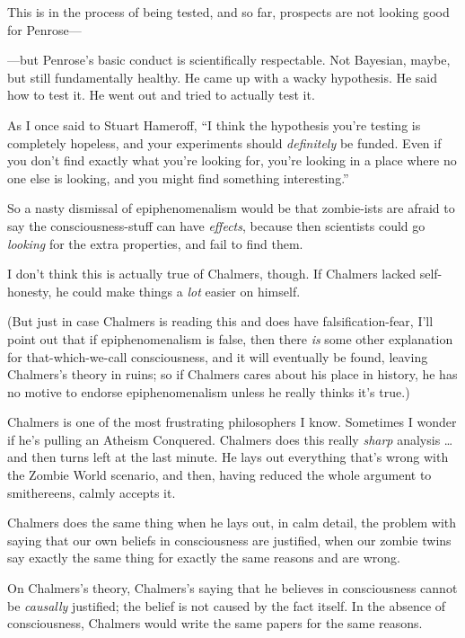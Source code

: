 {
 This is in the process of being tested, and so far, prospects are
not looking good for Penrose---}

{
 {}---but Penrose's basic conduct is scientifically
respectable. Not Bayesian, maybe, but still fundamentally healthy. He
came up with a wacky hypothesis. He said how to test it. He went out
and tried to actually test it.}

{
 As I once said to Stuart Hameroff, ``I think the
hypothesis you're testing is completely hopeless, and
your experiments should \textit{definitely} be funded. Even if you
don't find exactly what you're looking
for, you're looking in a place where no one else is
looking, and you might find something interesting.''}

{
 So a nasty dismissal of epiphenomenalism would be that zombie-ists
are afraid to say the consciousness-stuff can have \textit{effects},
because then scientists could go \textit{looking} for the extra
properties, and fail to find them.}

{
 I don't think this is actually true of Chalmers,
though. If Chalmers lacked self-honesty, he could make things a
\textit{lot} easier on himself.}

{
 (But just in case Chalmers is reading this and does have
falsification-fear, I'll point out that if
epiphenomenalism is false, then there \textit{is} some other
explanation for that-which-we-call consciousness, and it will
eventually be found, leaving Chalmers's theory in
ruins; so if Chalmers cares about his place in history, he has no
motive to endorse epiphenomenalism unless he really thinks
it's true.)}

{
 Chalmers is one of the most frustrating philosophers I know.
Sometimes I wonder if he's pulling an Atheism
Conquered. Chalmers does this really \textit{sharp} analysis \ldots and
then turns left at the last minute. He lays out everything
that's wrong with the Zombie World scenario, and then,
having reduced the whole argument to smithereens, calmly accepts it.}

{
 Chalmers does the same thing when he lays out, in calm detail, the
problem with saying that our own beliefs in consciousness are
justified, when our zombie twins say exactly the same thing for exactly
the same reasons and are wrong.}

{
 On Chalmers's theory, Chalmers's
saying that he believes in consciousness cannot be \textit{causally}
justified; the belief is not caused by the fact itself. In the absence
of consciousness, Chalmers would write the same papers for the same
reasons.}

